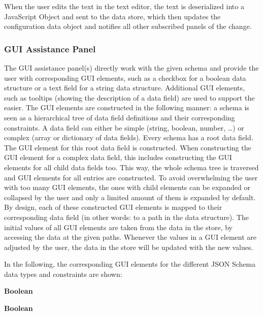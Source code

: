 When the user edits the text in the text editor, the text is deserialized into a JavaScript Object and sent to the data store, which then updates the configuration data object and notifies all other subscribed panels of the change.


\subsubsection{GUI Assistance Panel}
The GUI assistance panel(s) directly work with the given schema and provide the user with corresponding GUI elements, such as a checkbox for a boolean data structure or a text field for a string data structure.
Additional GUI elements, such as tooltips (showing the description of a data field) are used to support the easier.
The GUI elements are constructed in the following manner: a schema is seen as a hierarchical tree of data field definitions and their corresponding constraints.
A data field can either be simple (string, boolean, number, \ldots) or complex (array or dictionary of data fields).
Every schema has a root data field.
The GUI element for this root data field is constructed. %
When constructing the GUI element for a complex data field, this includes constructing the GUI elements for all child data fields too.
This way, the whole schema tree is traversed and GUI elements for all entries are constructed.
To avoid overwhelming the user with too many GUI elements, the ones with child elements can be expanded or collapsed by the user and only a limited amount of them is expanded by default.
By design, each of these constructed GUI elements is mapped to their corresponding data field (in other words: to a path in the data structure).
The initial values of all GUI elements are taken from the data in the store, by accessing the data at the given paths.
Whenever the values in a GUI element are adjusted by the user, the data in the store will be updated with the new values.

In the following, the corresponding GUI elements for the different JSON Schema data types and constraints are shown:

\textbf{Boolean}


\textbf{Boolean}

